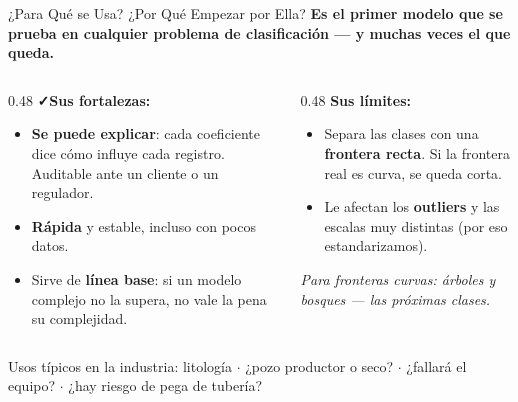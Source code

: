 \documentclass[aspectratio=169, 11pt]{beamer}
\begin{document}
\begin{frame}[shrink=8]{¿Para Qué se Usa? ¿Por Qué Empezar por Ella?}
  \vspace{-4pt}
  {\small\color{arcaDark}\bfseries
    Es el \textbf{primer modelo} que se prueba en cualquier problema de clasificación --- y muchas veces el que queda.}

  \vspace{6pt}
  \begin{columns}[T]
    \begin{column}{0.48\textwidth}
      {\footnotesize\color{arcaDark}\bfseries\faCheck\hspace{4pt}Sus fortalezas:}
      \vspace{3pt}
      {\scriptsize\color{textMuted}
      \begin{itemize}\setlength{\itemsep}{4pt}
        \item[{\color{codeGreen}\scriptsize\faEye}]
          \textbf{Se puede explicar}: cada coeficiente dice cómo influye
          cada registro. Auditable ante un cliente o un regulador.
        \item[{\color{codeGreen}\scriptsize\faBolt}]
          \textbf{Rápida} y estable, incluso con pocos datos.
        \item[{\color{codeGreen}\scriptsize\faRuler}]
          Sirve de \textbf{línea base}: si un modelo complejo no la supera,
          no vale la pena su complejidad.
      \end{itemize}
      }
    \end{column}
    \begin{column}{0.48\textwidth}
      {\footnotesize\color{arcaDark}\bfseries\faTimes\hspace{4pt}Sus límites:}
      \vspace{3pt}
      {\scriptsize\color{textMuted}
      \begin{itemize}\setlength{\itemsep}{4pt}
        \item[{\color{arcaRed}\scriptsize\faExclamationTriangle}]
          Separa las clases con una \textbf{frontera recta}. Si la frontera
          real es curva, se queda corta.
        \item[{\color{arcaRed}\scriptsize\faExclamationTriangle}]
          Le afectan los \textbf{outliers} y las escalas muy distintas
          (por eso estandarizamos).
      \end{itemize}
      }
      \vspace{4pt}
      {\scriptsize\color{arcaDark}\itshape
        Para fronteras curvas: árboles y bosques
        --- las próximas clases.}
    \end{column}
  \end{columns}

  \vspace{5pt}
  \centering
  {\scriptsize\color{textMuted}
    Usos típicos en la industria: litología \(\cdot\) ¿pozo productor o seco? \(\cdot\)
    ¿fallará el equipo? \(\cdot\) ¿hay riesgo de pega de tubería?}
\end{frame}
\end{document}

